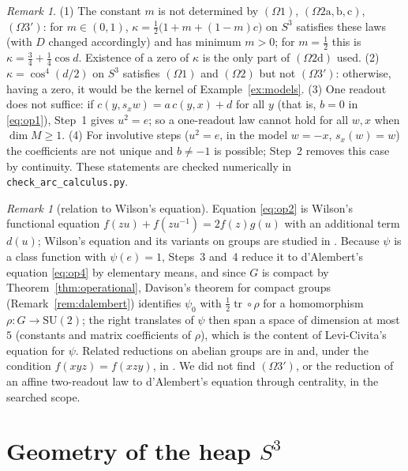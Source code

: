 \documentclass[11pt,reqno]{amsart}
\theoremstyle{definition}
\theoremstyle{remark}
\newtheorem{remark}[theorem]{Remark}
\numberwithin{equation}{section}
\newcommand{\SU}{\mathrm{SU}}
\begin{document}
\begin{remark}\label{rem:operational}
(1) The constant $m$ is not determined by $(\Omega1)$, $(\Omega2\mathrm{a,b,c})$, $(\Omega3')$: for $m\in(0,1)$,
$\kappa=\tfrac12\bigl(1+m+(1-m)c\bigr)$ on $S^3$ satisfies these laws (with $D$ changed accordingly) and has minimum
$m>0$; for $m=\tfrac12$ this is $\kappa=\tfrac34+\tfrac14\cos d$.  Existence of a zero of $\kappa$ is the only part of
$(\Omega2\mathrm d)$ used.  (2) $\kappa=\cos^4(d/2)$ on $S^3$ satisfies $(\Omega1)$ and $(\Omega2)$ but not $(\Omega3')$: otherwise, having a zero, it
would be the kernel of Example~\ref{ex:models}.
(3) One readout does not suffice: if $c(y,s_xw)=a\,c(y,x)+d$ for all $y$ (that is, $b=0$ in \eqref{eq:op1}), Step~1 gives
$u^2=e$; so a one-readout law cannot hold for all $w,x$ when $\dim M\ge1$.  (4) For involutive steps ($u^2=e$, in the
model $w=-x$, $s_x(w)=w$) the coefficients are not unique and $b\ne-1$ is possible; Step~2 removes this case by
continuity.  These statements are checked numerically in \texttt{check\_arc\_calculus.py}.
\end{remark}

\begin{remark}[relation to Wilson's equation]
Equation \eqref{eq:op2} is Wilson's functional equation $f(zu)+f(zu^{-1})=2f(z)g(u)$ with an additional term
$d(u)$; Wilson's equation and its variants on groups are studied in \cite{Stetkaer}.  Because $\psi$ is a class
function with $\psi(e)=1$, Steps~3 and~4 reduce it to d'Alembert's equation \eqref{eq:op4} by elementary means, and
since $G$ is compact by Theorem~\ref{thm:operational}, Davison's theorem for compact groups (Remark~\ref{rem:dalembert})
identifies $\psi_0$ with $\tfrac12\operatorname{tr}\circ\rho$ for a homomorphism $\rho\colon G\to\SU(2)$; the right translates of $\psi$ then span a space of dimension at most $5$ (constants
and matrix coefficients of $\rho$), which is the content of Levi-Civita's equation for $\psi$.  Related reductions on abelian groups are in \cite{Stetkaer98} and, under the condition $f(xyz)=f(xzy)$, in
\cite[Lemma~1]{CENSZ95}.  We did not find $(\Omega3')$, or the reduction of an affine two-readout law to d'Alembert's
equation through centrality, in the searched scope.
\end{remark}

\section{Geometry of the heap \texorpdfstring{$S^3$}{S3}}\label{sec:geom}
\end{document}
